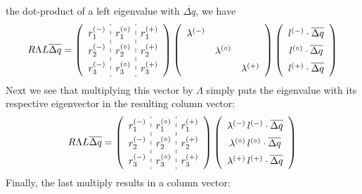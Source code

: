 \documentclass[11pt]{article}
\newcommand{\evm}{{(-)}}
\newcommand{\evz}{{(\circ)}}
\newcommand{\evp}{{(+)}}
\begin{document}
the dot-product of a left eigenvalue with $\overline{\Delta q}$, we have
\begin{equation}
\renewcommand{\arraystretch}{1.5}
R\Lambda L \overline{\Delta q} =
   \left ( \begin{array}{c:c:c}
             r_1^\evm & r_1^\evz & r_1^\evp \\
             r_2^\evm & r_2^\evz & r_2^\evp \\
             r_3^\evm & r_3^\evz & r_3^\evp \end{array} \right )
   \left ( \begin{array}{ccc}
             \lambda^\evm &              & \\
                          & \lambda^\evz & \\
                          &              & \lambda^\evp \end{array} \right )
   \left ( \begin{array}{c}
            l^\evm \cdot \overline{\Delta q} \\
            l^\evz \cdot \overline{\Delta q} \\
            l^\evp \cdot \overline{\Delta q} \end{array} \right )
\renewcommand{\arraystretch}{1.0}
\end{equation}
Next we see that multiplying this vector by $\Lambda$ simply puts the
eigenvalue with its respective eigenvector in the resulting column vector:
\begin{equation}
\renewcommand{\arraystretch}{1.5}
R\Lambda L \overline{\Delta q} =
   \left ( \begin{array}{c:c:c}
             r_1^\evm & r_1^\evz & r_1^\evp \\
             r_2^\evm & r_2^\evz & r_2^\evp \\
             r_3^\evm & r_3^\evz & r_3^\evp \end{array} \right )
   \left ( \begin{array}{c}
            \lambda^\evm \, l^\evm \cdot \overline{\Delta q} \\
            \lambda^\evz \, l^\evz \cdot \overline{\Delta q} \\
            \lambda^\evp \, l^\evp \cdot \overline{\Delta q} \end{array} \right )
\renewcommand{\arraystretch}{1.0}
\end{equation}
Finally, the last multiply results in a column vector:
\end{document}
